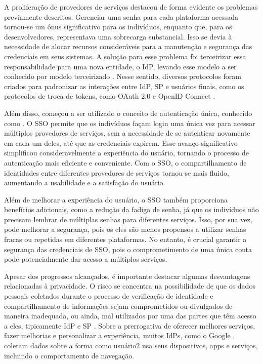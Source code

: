 A proliferação de provedores de serviços destacou de forma evidente os problemas previamente descritos. Gerenciar uma senha para cada plataforma acessada tornou-se um ônus significativo para os indivíduos, enquanto que, para os desenvolvedores, representava uma sobrecarga substancial. Isso se devia à necessidade de alocar recursos consideráveis para a manutenção e segurança das credenciais em seus sistemas. A solução para esse problema foi terceirizar essa responsabilidade para uma nova entidade, o \acs{IdP}, levando esse modelo a ser conhecido por modelo terceirizado \cite{revisao-ssi-frederico}. Nesse sentido, diversos protocolos foram criados para padronizar as interações entre \acs{IdP}, \acs{SP} e usuários finais, como os protocolos de troca de tokens, como OAuth 2.0 \cite{oauth} e OpenID Connect \cite{openid}.

Além disso, começou a ser utilizado o conceito de autenticação única, conhecido como . O \acs{SSO} permite que os indivíduos façam login uma única vez para acessar múltiplos provedores de serviços, sem a necessidade de se autenticar novamente em cada um deles, até que as credenciais expirem. Esse avanço significativo simplificou consideravelmente a experiência do usuário, tornando o processo de autenticação mais eficiente e conveniente. Com o \acs{SSO}, o compartilhamento de identidades entre diferentes provedores de serviços tornou-se mais fluido, aumentando a usabilidade e a satisfação do usuário.

Além de melhorar a experiência do usuário, o \acs{SSO} também proporciona benefícios adicionais, como a redução da fadiga de senha, já que os indivíduos não precisam lembrar de múltiplas senhas para diferentes serviços. Isso, por sua vez, pode melhorar a segurança, pois os eles são menos propensos a utilizar senhas fracas ou repetidas em diferentes plataformas. No entanto, é crucial garantir a segurança das credenciais de \acs{SSO}, pois o comprometimento de uma única conta pode potencialmente dar acesso a múltiplos serviços.

Apesar dos progressos alcançados, é importante destacar algumas desvantagens relacionadas à privacidade. O risco se concentra na possibilidade de que os dados pessoais coletados durante o processo de verificação de identidade e compartilhamento de informações sejam comprometidos ou divulgados de maneira inadequada, ou ainda, mal utilizados por uma das partes que têm acesso a eles, tipicamente \acs{IdP} e \acs{SP} \cite{pandey2012investigation}. Sobre a prerrogativa de oferecer melhores serviços, fazer melhorias e personalizar a experiência, muitos \acs{IdP}s, como o Google \cite{sidell2020google}, coletam dados sobre a forma como usuário2 usa seus dispositivos, apps e serviços, incluindo o comportamento de navegação.


